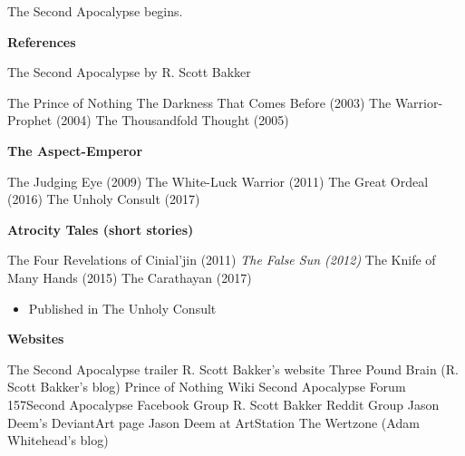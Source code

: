 \documentclass[]{book}
\providecommand{\tightlist}{%
  \setlength{\itemsep}{0pt}\setlength{\parskip}{0pt}}
\begin{document}
The Second Apocalypse begins.

\textbf{References}

The Second Apocalypse by R. Scott Bakker

The Prince of Nothing
The Darkness That Comes Before (2003)
The Warrior-Prophet (2004)
The Thousandfold Thought (2005)

\textbf{The Aspect-Emperor}

The Judging Eye (2009)
The White-Luck Warrior (2011)
The Great Ordeal (2016)
The Unholy Consult (2017)

\textbf{Atrocity Tales (short stories)}

The Four Revelations of Cinial'jin (2011)\emph{
The False Sun (2012)}
The Knife of Many Hands (2015)
The Carathayan (2017)

\begin{itemize}
\tightlist
\item
  Published in The Unholy Consult
\end{itemize}

\textbf{Websites}

The Second Apocalypse trailer
R. Scott Bakker's website
Three Pound Brain (R. Scott Bakker's blog)
Prince of Nothing Wiki
Second Apocalypse Forum
157Second Apocalypse Facebook Group
R. Scott Bakker Reddit Group
Jason Deem's DeviantArt page
Jason Deem at ArtStation
The Wertzone (Adam Whitehead's blog)
\end{document}
